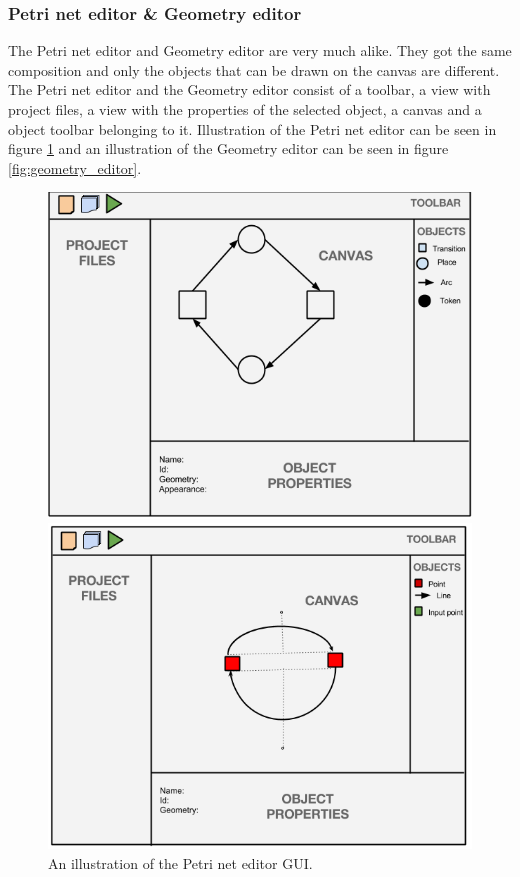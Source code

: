 \subsubsection{Petri net editor \& Geometry editor}
The Petri net editor and Geometry editor are very much alike. They got the same composition and only the objects that can be drawn on the canvas are different. The Petri net editor and the Geometry editor consist of a toolbar, a view with project files, a view with the properties of the selected object, a canvas and a object toolbar belonging to it. Illustration of the Petri net editor can be seen in figure \ref{fig:petrinet_editor} and an illustration of the Geometry editor can be seen in figure \ref{fig:geometry_editor}. 

\begin{figure}[ht]
	\begin{minipage}[b]{0.45\linewidth}
	\centering
		\includegraphics[scale=0.3]{image/petri.png}
\caption{An illustration of the Petri net editor GUI.}
\label{fig:petrinet_editor}
	\end{minipage}
\hspace{0.5cm}
	\begin{minipage}[b]{0.45\linewidth}
	\centering
		\includegraphics[scale=0.3]{image/geometry.png}

\end{minipage}
\end{figure}
